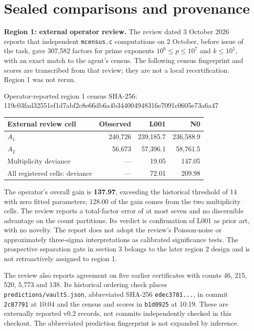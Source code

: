 \documentclass[11pt,a4paper]{article}
\newcommand{\sha}[1]{{\scriptsize\ttfamily #1}\par}
\begin{document}
\newpage
\section{Sealed comparisons and provenance}
\textbf{Region 1: external operator review.} The review dated 3 October
2026 reports that independent \texttt{mcensus.c} computations on 2 October,
before issue of the task, gave 307,582 factors for prime exponents
$10^6\le p\le10^7$ and $k\le10^5$, with an exact match to the agent's census.
The following census fingerprint and scores are transcribed from that review;
they are not a local recertification. Region 1 was not rerun.

Operator-reported region 1 census SHA-256:\\[-0.6em]
\sha{119c03fad32551ef1d7abf2c8e66db6a4b344004948316e7091c0605e73a6a47}

\begin{center}\small
\begin{tabular}{lrrr}
\toprule
External review cell & Observed & L001 & N0\\
\midrule
$A_1$ & 240,726 & 239,185.7 & 236,588.9\\
$A_2$ & 56,673 & 57,396.1 & 58,761.5\\
Multiplicity deviance & --- & 19.05 & 147.05\\
All registered cells: deviance & --- & 72.01 & 209.98\\
\bottomrule
\end{tabular}
\end{center}

The operator's overall gain is \textbf{137.97}, exceeding the historical
threshold of 14 with zero fitted parameters; 128.00 of the gain comes from
the two multiplicity cells. The review reports a total-factor error of at
most seven and no discernible advantage on the count partitions. Its verdict
is confirmation of L001 as prior art, with no novelty. The report does not
adopt the review's Poisson-noise or approximately three-sigma interpretations
as calibrated significance tests. The prospective separation gate in section
3 belongs to the later region 2 design and is not retroactively assigned to
region 1.

The review also reports agreement on five earlier certificates with counts
46, 215, 520, 5,773 and 138. Its historical ordering check places
\texttt{predictions/vaultS.json}, abbreviated SHA-256 \texttt{edec3781...},
in commit \texttt{2c87791} at 10:04 and the census and scores in
\texttt{b1d0925} at 10:19. These are externally reported v0.2 records,
not commits independently checked in this checkout. The abbreviated
prediction fingerprint is not expanded by inference.
\end{document}
